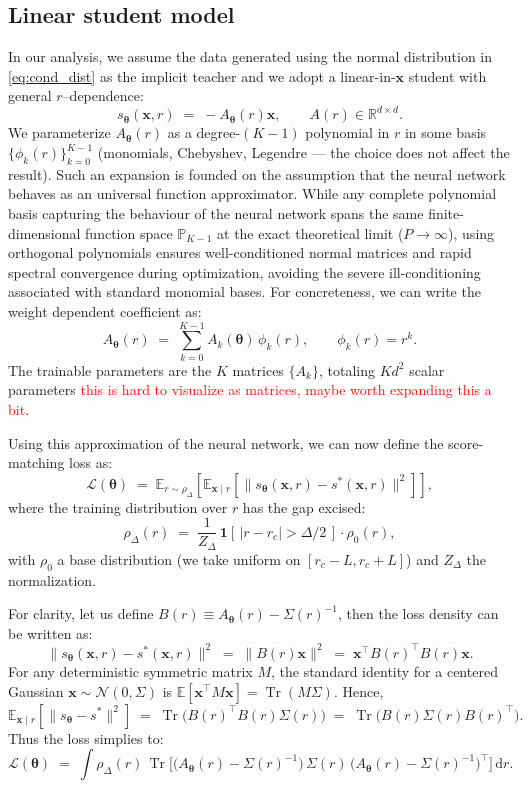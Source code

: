 \documentclass[11pt,a4paper]{article}
\theoremstyle{remark}
\newcommand{\E}{\mathbb{E}}
\newcommand{\R}{\mathbb{R}}
\newcommand{\bx}{\mathbf{x}}
\newcommand{\btheta}{\boldsymbol{\theta}}
\newcommand{\Tr}{\operatorname{Tr}}
\newcommand{\indicator}{\mathbf{1}}
\newcommand{\rmd}{\textrm{d}}
\newcommand{\Th}{{\btheta}}
\newcommand{\meanr}[1]{\E_{r \sim \rho_\Delta}\!\left[#1\right]}
\newcommand{\meanx}[1]{\E_{\bx \mid r}\!\left[#1\right]}
\def\sgp#1{{\sf\textcolor{red}{#1}}}
\begin{document}
\begin{onehalfspace}
\subsection{Linear student model}
In our analysis, we assume the data generated using the normal distribution in \eqref{eq:cond_dist} as the implicit teacher and we adopt a linear-in-$\bx$ student with general $r$--dependence:
\begin{equation}
s_{\btheta}(\bx, r) \;=\; -A_{\Th}(r) \bx, \qquad A(r) \in \R^{d \times d}.
\label{eq:student}
\end{equation}
We parameterize $A_\Th(r)$ as a degree-$(K-1)$ polynomial in $r$ in some basis $\{\phi_k(r)\}_{k=0}^{K-1}$ (monomials, Chebyshev, Legendre --- the choice does not affect the result). Such an expansion is founded on the assumption that the neural network behaves as an universal function approximator. While any complete polynomial basis capturing the behaviour of the neural network spans the same finite-dimensional function space $\mathbb{P}_{K-1}$ at the exact theoretical limit ($P \to \infty$), using orthogonal polynomials ensures well-conditioned normal matrices and rapid spectral convergence during optimization, avoiding the severe ill-conditioning associated with standard monomial bases. For concreteness, we can write the weight dependent coefficient as:
\[
A_\Th(r) \;=\; \sum_{k=0}^{K-1} A_k(\Th)\, \phi_k(r), \qquad \phi_k(r) = r^k.
\]
The trainable parameters are the $K$ matrices $\{A_k\}$, totaling $Kd^2$ scalar parameters \sgp{this is hard to visualize as matrices, maybe worth expanding this a bit}.

\noindent Using this approximation of the neural network, we can now define the score-matching loss as:
\begin{equation}
\mathcal{L}(\btheta) \;=\; \meanr{\meanx{ \big\| s_{\btheta}(\bx, r) - s^*(\bx, r) \big\|^2 }},
\label{eq:loss_pop}
\end{equation}
where the training distribution over $r$ has the gap excised:
\begin{equation}
\rho_\Delta(r) \;=\; \frac{1}{Z_\Delta}\, \indicator[\,|r-r_c| > \Delta/2\,] \cdot \rho_0(r),
\label{eq:rho_Delta}
\end{equation}
with $\rho_0$ a base distribution (we take uniform on $[r_c - L, r_c + L]$) and $Z_\Delta$ the normalization.

\noindent For clarity, let us define $B(r) \equiv A_\Th(r) - \Sigma(r)^{-1}$, then the loss density can be written as:
\[
\big\| s_{\btheta}(\bx, r) - s^*(\bx, r) \big\|^2 \;=\; \big\| B(r) \bx \big\|^2 \;=\; \bx^\top B(r)^\top B(r) \bx.
\]
For any deterministic symmetric matrix $M$, the standard identity for a centered Gaussian $\bx \sim \mathcal{N}(0, \Sigma)$ is $\E[\bx^\top M \bx] = \Tr(M \Sigma)$. Hence,
\[
\meanx{\| s_{\btheta} - s^*\|^2} \;=\; \Tr\!\big(B(r)^\top B(r) \Sigma(r)\big) \;=\; \Tr\!\big(B(r) \Sigma(r) B(r)^\top\big).
\]
Thus the loss simplies to:
\begin{equation}
\mathcal{L}(\btheta) \;=\; \int \rho_\Delta(r)\, \Tr\!\Big[\big(A_\Th(r) - \Sigma(r)^{-1}\big)\, \Sigma(r)\, \big(A_\Th(r) - \Sigma(r)^{-1}\big)^\top \Big]\, \rmd r.
\label{eq:loss_explicit}
\end{equation}


\end{onehalfspace}
\end{document}
